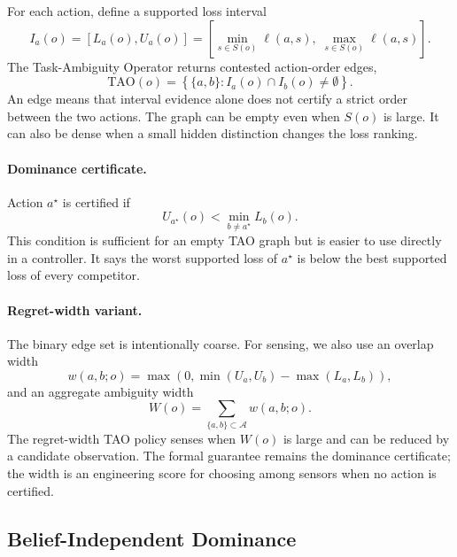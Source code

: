 \documentclass{article}
\newcommand{\actions}{\mathcal{A}}
\newcommand{\loss}{\ell}
\newcommand{\tao}{\mathrm{TAO}}
\begin{document}
For each action, define a supported loss interval
\begin{equation}
  I_a(o) = [L_a(o), U_a(o)] =
  \left[\min_{s\in S(o)} \loss(a,s),\; \max_{s\in S(o)} \loss(a,s)\right].
\end{equation}
The Task-Ambiguity Operator returns contested action-order edges,
\begin{equation}
  \tao(o) =
  \left\{\{a,b\}: I_a(o)\cap I_b(o)\neq\emptyset\right\}.
  \label{eq:tao}
\end{equation}
An edge means that interval evidence alone does not certify a strict order between the two actions. The graph can be empty even when $S(o)$ is large. It can also be dense when a small hidden distinction changes the loss ranking.

\paragraph{Dominance certificate.}
Action $a^\star$ is certified if
\begin{equation}
  U_{a^\star}(o) < \min_{b\neq a^\star} L_b(o).
  \label{eq:dominance}
\end{equation}
This condition is sufficient for an empty TAO graph but is easier to use directly in a controller. It says the worst supported loss of $a^\star$ is below the best supported loss of every competitor.

\paragraph{Regret-width variant.}
The binary edge set is intentionally coarse. For sensing, we also use an overlap width
\begin{equation}
  w(a,b;o) =
  \max\left(0,\min(U_a,U_b)-\max(L_a,L_b)\right),
\end{equation}
and an aggregate ambiguity width
\begin{equation}
  W(o) = \sum_{\{a,b\}\subset\actions} w(a,b;o).
\end{equation}
The regret-width TAO policy senses when $W(o)$ is large and can be reduced by a candidate observation. The formal guarantee remains the dominance certificate; the width is an engineering score for choosing among sensors when no action is certified.

\subsection{Belief-Independent Dominance}
\end{document}
